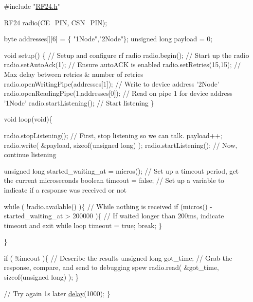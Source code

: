 \begin{DoxyCodeInclude}
\textcolor{preprocessor}{#include "\hyperlink{RF24_8h}{RF24.h}"}

\hyperlink{classRF24}{RF24} radio(CE\_PIN, CSN\_PIN);

byte addresses[][6] = \{
  \textcolor{stringliteral}{"1Node"},\textcolor{stringliteral}{"2Node"}\};
\textcolor{keywordtype}{unsigned} \textcolor{keywordtype}{long} payload = 0;

\textcolor{keywordtype}{void} setup() \{
  \textcolor{comment}{// Setup and configure rf radio}
  radio.begin(); \textcolor{comment}{// Start up the radio}
  radio.setAutoAck(1); \textcolor{comment}{// Ensure autoACK is enabled}
  radio.setRetries(15,15); \textcolor{comment}{// Max delay between retries & number of retries}
  radio.openWritingPipe(addresses[1]); \textcolor{comment}{// Write to device address '2Node'}
  radio.openReadingPipe(1,addresses[0]); \textcolor{comment}{// Read on pipe 1 for device address '1Node'}
  radio.startListening(); \textcolor{comment}{// Start listening}
\}

\textcolor{keywordtype}{void} loop(\textcolor{keywordtype}{void})\{
  
  radio.stopListening(); \textcolor{comment}{// First, stop listening so we can talk.}
  payload++;
  radio.write( &payload, \textcolor{keyword}{sizeof}(\textcolor{keywordtype}{unsigned} \textcolor{keywordtype}{long}) );
  radio.startListening(); \textcolor{comment}{// Now, continue listening}

    \textcolor{keywordtype}{unsigned} \textcolor{keywordtype}{long} started\_waiting\_at = micros(); \textcolor{comment}{// Set up a timeout period, get the current microseconds}
  \textcolor{keywordtype}{boolean} timeout = \textcolor{keyword}{false}; \textcolor{comment}{// Set up a variable to indicate if a response was received or not}

  \textcolor{keywordflow}{while} ( !radio.available() )\{ \textcolor{comment}{// While nothing is received}
    \textcolor{keywordflow}{if} (micros() - started\_waiting\_at > 200000 )\{ \textcolor{comment}{// If waited longer than 200ms, indicate timeout and exit
       while loop}
      timeout = \textcolor{keyword}{true};
      \textcolor{keywordflow}{break};
    \}

  \}

  \textcolor{keywordflow}{if} ( !timeout )\{ \textcolor{comment}{// Describe the results}
    \textcolor{keywordtype}{unsigned} \textcolor{keywordtype}{long} got\_time; \textcolor{comment}{// Grab the response, compare, and send to debugging spew}
    radio.read( &got\_time, \textcolor{keyword}{sizeof}(\textcolor{keywordtype}{unsigned} \textcolor{keywordtype}{long}) );
  \}

  \textcolor{comment}{// Try again 1s later}
  \hyperlink{group__Porting__General_ga70a331e8ddf9acf9d33c47b71cda4c5f}{delay}(1000);
\}
\end{DoxyCodeInclude}
 